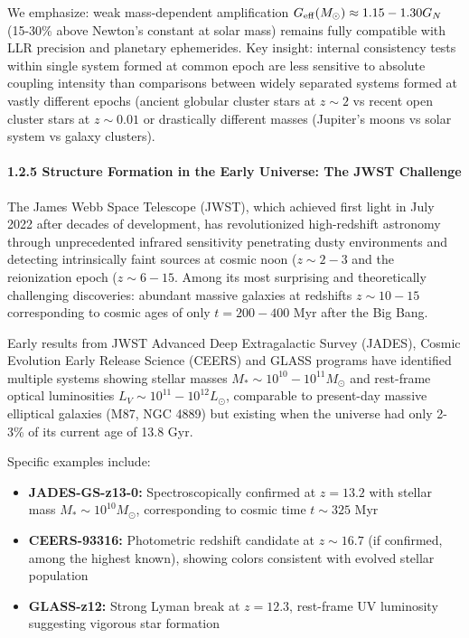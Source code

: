 \documentclass[10pt,a4paper]{article}
\providecommand{\tightlist}{\setlength{\itemsep}{0pt}\setlength{\parskip}{0pt}}
\begin{document}
We emphasize: weak mass-dependent amplification
\(G_{\rm eff}(M_\odot) \approx 1.15-1.30 G_N\) (15-30\% above Newton's
constant at solar mass) remains fully compatible with LLR precision and
planetary ephemerides. Key insight: internal consistency tests within
single system formed at common epoch are less sensitive to absolute
coupling intensity than comparisons between widely separated systems
formed at vastly different epochs (ancient globular cluster stars at
\(z \sim 2\) vs recent open cluster \cite{Geller2015} stars at \(z \sim 0.01\) or
drastically different masses (Jupiter's moons vs solar system vs galaxy
clusters).

\paragraph{1.2.5 Structure Formation in the Early Universe: The JWST
Challenge}\label{structure-formation-in-the-early-universe-the-jwst-challenge}

The James Webb Space Telescope (JWST), which achieved first light in
July 2022 after decades of development, has revolutionized high-redshift
astronomy through unprecedented infrared sensitivity penetrating dusty
environments and detecting intrinsically faint sources at cosmic noon
(\(z \sim 2-3\) and the reionization epoch (\(z \sim 6-15\). Among its
most surprising and theoretically challenging discoveries: abundant
massive galaxies at redshifts \(z \sim 10-15\) corresponding to cosmic
ages of only \(t = 200-400\) Myr after the Big Bang.

Early results from JWST Advanced Deep Extragalactic Survey (JADES),
Cosmic Evolution Early Release Science (CEERS) and GLASS programs have
identified multiple systems showing stellar masses
\(M_* \sim 10^{10}-10^{11} M_\odot\) and rest-frame optical luminosities
\(L_V \sim 10^{11}-10^{12} L_\odot\), comparable to present-day massive
elliptical galaxies (M87, NGC 4889) but existing when the universe had
only 2-3\% of its current age of 13.8 Gyr.

Specific examples include:

\begin{itemize}
\tightlist
\item
  \textbf{JADES-GS-z13-0:} Spectroscopically confirmed at \(z = 13.2\)
  with stellar mass \(M_* \sim 10^{10} M_\odot\), corresponding to
  cosmic time \(t \sim 325\) Myr
\item
  \textbf{CEERS-93316:} Photometric redshift candidate at
  \(z \sim 16.7\) (if confirmed, among the highest known), showing
  colors consistent with evolved stellar population
\item
  \textbf{GLASS-z12:} Strong Lyman break at \(z = 12.3\), rest-frame UV
  luminosity suggesting vigorous star formation
\end{itemize}
\end{document}
